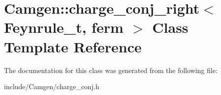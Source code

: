 \hypertarget{a00069}{\section{Camgen\-:\-:charge\-\_\-conj\-\_\-right$<$ Feynrule\-\_\-t, ferm $>$ Class Template Reference}
\label{a00069}
}


The documentation for this class was generated from the following file\-:\begin{DoxyCompactItemize}
\item 
include/\-Camgen/charge\-\_\-conj.\-h\end{DoxyCompactItemize}
